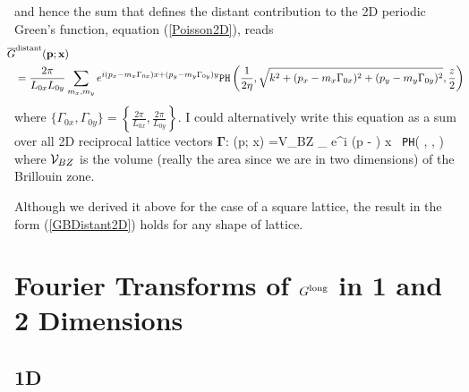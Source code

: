 \documentclass[letterpaper]{article}
\newcommand{\GB}{\overline{G}}
\newcommand{\vbGamma}{\boldsymbol{\Gamma}}
\begin{document}
and hence the sum that defines the distant contribution to the
2D periodic Green's function, equation (\ref{Poisson2D}), 
reads
\begin{align*}
&\hspace{-0.1in}\GB\sups{distant}(\vb p; \vb x) 
\\
&=\frac{2\pi}{L_{0x} L_{0y}} \sum_{m_x, m_y}
    e^{i (p_x - m_x\Gamma_{0x}) x + (p_y-m_y \Gamma_{0y}) y}
    \texttt{PH}\left( \frac{1}{2\eta}, 
                      \sqrt{k^2 + (p_x-m_x \Gamma_{0x})^2 + (p_y-m_y\Gamma_{0y})^2},
                      \frac{z}{2}
               \right)
\end{align*}
where $\{\Gamma_{0x}, \Gamma_{0y}\}=\left\{\frac{2\pi}{L_{0x}}, \frac{2\pi}{L_{0y}}\right\}$.
I could alternatively write this equation as a sum over all 
2D reciprocal lattice vectors $\vbGamma$:
{
   \GB{}(\vb p; \vb x) 
   =\mc V_{BZ} \sum_{\vbGamma} 
    e^{i (\vb p - \vbGamma) \cdot \vb x} \,
    \texttt{PH}\left( , 
                      \sqrt{k^2 + |\vb p - \vbGamma|^2},
               \right)
}
where $\mathcal{V}_{BZ}$ is the volume (really the area since we 
are in two dimensions) of the Brillouin zone.

Although we derived it above for the case of a square lattice,
the result in the form (\ref{GBDistant2D}) holds for any 
shape of lattice.

\appendix 

\newpage
\section{Fourier Transforms of $G^{\hbox{\scriptsize{long}}}$ in 1 and 2 Dimensions}

\subsection{1D}
\end{document}
